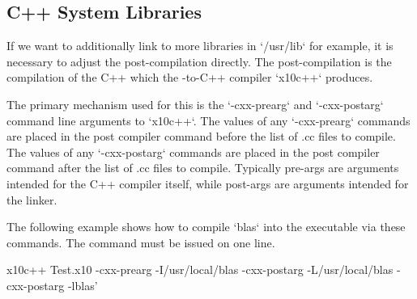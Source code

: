 \subsection{C++ System Libraries}

If we want to additionally link to more libraries in \xcd`/usr/lib` for
example, it is necessary to adjust the post-compilation directly.  The
post-compilation is the compilation of the C++ which the \Xten{}-to-C++ compiler
\xcd`x10c++` produces.  

The primary mechanism used for this is the \xcd`-cxx-prearg` and
\xcd`-cxx-postarg` command line arguments to
\xcd`x10c++`. The values of any \xcd`-cxx-prearg` commands are placed
in the post compiler command before the list of .cc files to compile.
The values of any \xcd`-cxx-postarg` commands are placed in the post
compiler command after the list of .cc files to compile. Typically
pre-args are arguments intended for the C++ compiler itself, while
post-args are arguments intended for the linker. 

The following example shows how to compile \xcd`blas` into the
executable via these commands. The command must be issued on one line.

\begin{xten}
x10c++ Test.x10 -cxx-prearg -I/usr/local/blas 
  -cxx-postarg -L/usr/local/blas -cxx-postarg -lblas'
\end{xten}

